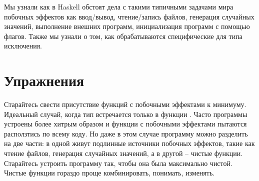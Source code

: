 Мы узнали как в Haskell обстоят дела с такими типичными
задачами мира побочных эффектов как ввод/вывод, чтение/запись файлов,
генерация случайных значений, выполнение внешних программ,
инициализация программ с помощью флагов. Также мы узнали
о том, как обрабатываются специфические для типа  
исключения.


\section{Упражнения}

Старайтесь свести присутствие функций с побочными 
эффектами к минимуму. Идеальный случай, когда тип 
встречается только в функции . Часто программы
устроены более хитрым образом и функции с побочными 
эффектами пытаются расползтись по всему коду. Но даже
в этом случае программу можно разделить на две части:
в одной живут подлинные источники побочных эффектов, 
такие как чтение файлов, генерация случайных значений,
а в другой -- чистые функции. Старайтесь устроить программу
так, чтобы она была максимально чистой. Чистые функции
гораздо проще комбинировать, понимать, изменять.  

